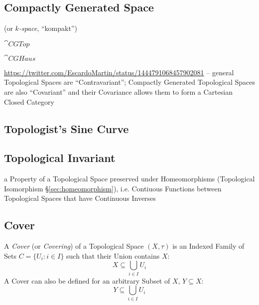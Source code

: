 \subsection{Compactly Generated Space}\label{sec:compactly_generated}

(or \emph{$k$-space}, ``kompakt'')

$\cat{CGTop}$

$\cat{CGHaus}$

\url{https://twitter.com/EscardoMartin/status/1444791068457902081} -- general
Topological Spaces are ``Contravariant''; Compactly Generated Topological Spaces
are also ``Covariant'' and their Covariance allows them to form a Cartesian
Closed Category



\subsection{Topologist's Sine Curve}\label{sec:topologists_sine}

\subsection{Topological Invariant}\label{sec:topological_invariant}

a Property of a Topological Space preserved under Homeomorphisms
(Topological Isomorphism \S\ref{sec:homeomorphism}), i.e. Contiuous Functions
between Topological Spaces that have Continuous Inverses



\subsection{Cover}\label{sec:topological_cover}

A \emph{Cover} (or \emph{Covering}) of a Topological Space $(X, \tau)$
is an Indexed Family of Sets $C = \{ U_i : i \in I \}$ such that their
Union contains $X$:
\[
  X \subseteq \bigcup_{i \in I} U_i
\]
A Cover can also be defined for an arbitrary Subset of $X$, $Y
\subseteq X$:
\[
  Y \subseteq \bigcup_{i \in I} U_i
\]

